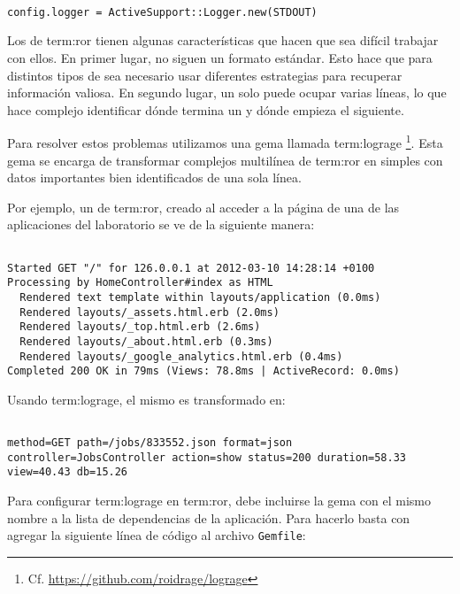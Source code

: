 \begin{lstlisting}

config.logger = ActiveSupport::Logger.new(STDOUT)

\end{lstlisting}

Los  de \gls{term:ror} tienen algunas características que hacen que sea
difícil trabajar con ellos. En primer lugar, no siguen un formato estándar.
Esto hace que para distintos tipos de  sea necesario usar diferentes
estrategias para recuperar información valiosa. En segundo lugar, un solo
 puede ocupar varias líneas, lo que hace complejo identificar dónde termina
un  y dónde empieza el siguiente.

Para resolver estos problemas utilizamos una gema llamada \gls{term:lograge}
\footnote{Cf. \url{https://github.com/roidrage/lograge}}. Esta gema se encarga
de transformar complejos  multilínea de \gls{term:ror} en simples  con
datos importantes bien identificados de una sola línea.

Por ejemplo, un  de \gls{term:ror}, creado al acceder a la página 
de una de las aplicaciones del laboratorio se ve de la siguiente manera:

\begin{lstlisting}

Started GET "/" for 126.0.0.1 at 2012-03-10 14:28:14 +0100
Processing by HomeController#index as HTML
  Rendered text template within layouts/application (0.0ms)
  Rendered layouts/_assets.html.erb (2.0ms)
  Rendered layouts/_top.html.erb (2.6ms)
  Rendered layouts/_about.html.erb (0.3ms)
  Rendered layouts/_google_analytics.html.erb (0.4ms)
Completed 200 OK in 79ms (Views: 78.8ms | ActiveRecord: 0.0ms)

\end{lstlisting}

Usando \gls{term:lograge}, el mismo  es transformado en:

\begin{lstlisting}

method=GET path=/jobs/833552.json format=json controller=JobsController action=show status=200 duration=58.33 view=40.43 db=15.26

\end{lstlisting}

Para configurar \gls{term:lograge} en \gls{term:ror}, debe incluirse la gema con
el mismo nombre a la lista de dependencias de la aplicación. Para hacerlo basta
con agregar la siguiente línea de código al archivo \texttt{Gemfile}:

